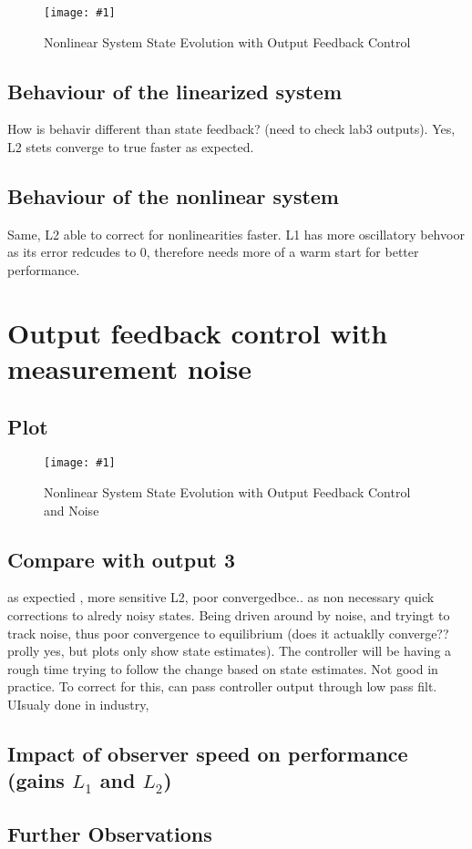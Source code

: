 \documentclass[10pt]{article}
\newcommand{\shrinkimage}[1]{\texttt{[image: \#1]}}
\begin{document}
\begin{figure}[h]
    \centering
    \shrinkimage{lab4/figs/nlin_noiseless_state_est_error_feedback.pdf}
    \caption{Nonlinear System State Evolution with Output Feedback Control}
    \label{fig:nlin_noiseless_state_est_error_feedback}
\end{figure}

\subsection{Behaviour of the linearized system}
How is behavir different than state feedback? (need to check lab3 outputs). Yes, L2 stets converge to true faster as expected.
\subsection{Behaviour of the nonlinear system}
Same, L2 able to correct for nonlinearities faster. L1 has more oscillatory behvoor as its error redcudes to 0, therefore needs more of a warm start for better performance.
\section{Output feedback control with measurement noise}

\subsection{Plot}
\begin{figure}[h]
    \centering
    \shrinkimage{lab4/figs/nlin_noisy_state_est_error_feedback.pdf}
    \caption{Nonlinear System State Evolution with Output Feedback Control and Noise}
    \label{fig:nlin_noisy_state_est_error_feedback}
\end{figure}

\subsection{Compare with output 3}
as expectied , more sensitive L2, poor convergedbce.. as non necessary quick corrections to alredy noisy states. Being driven around by noise, and tryingt to track noise, thus poor convergence to equilibrium (does it actuaklly converge?? prolly yes, but plots only show state estimates). The controller will be having a rough time trying to follow the change based on state estimates. Not good in practice.  To correct for this, can pass controller output through low pass filt. UIsualy done in industry,

\subsection{Impact of observer speed on performance (gains \texorpdfstring{$L_1$}{L1} and \texorpdfstring{$L_2$}{L2}) }

\subsection{Further Observations}
\end{document}

